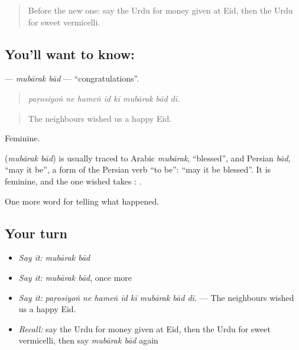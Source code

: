 \label{lesson:UR-C318-mubarak-bad}



\begin{quote}
Before the new one: say the Urdu for money given at Eid, then the Urdu for sweet vermicelli.
\end{quote}

\subsection*{You'll want to know:  }
\textbf{ } — \emph{mubārak bād} — \textquotedblleft{}congratulations\textquotedblright{}.

\begin{quote}
       
\end{quote}

\begin{quote}
\emph{paṛosiyoṅ ne hameṅ īd kī mubārak bād dī.}
\end{quote}

\begin{quote}
The neighbours wished us a happy Eid.
\end{quote}

Feminine.

\begin{cousinweb}
\textbf{ } (\emph{mubārak bād}) is usually traced to Arabic \emph{mubārak}, \textquotedblleft{}blessed\textquotedblright{}, and Persian \emph{bād}, \textquotedblleft{}may it be\textquotedblright{}, a form of the Persian verb \textquotedblleft{}to be\textquotedblright{}: \textquotedblleft{}may it be blessed\textquotedblright{}. It is feminine, and the one wished takes \textbf{}: \textbf{   }.
\end{cousinweb}

\begin{grammarlens}[title={What you've built}]
One more word for telling what happened.
\end{grammarlens}

\subsection*{Your turn}
\begin{itemize}
\raggedright
  \item \emph{Say it:} \emph{mubārak bād}
  \item \emph{Say it:} \emph{mubārak bād}, once more
  \item \emph{Say it:} \emph{paṛosiyoṅ ne hameṅ īd kī mubārak bād dī.} — The neighbours wished us a happy Eid.
  \item \emph{Recall:} say the Urdu for money given at Eid, then the Urdu for sweet vermicelli, then say \emph{mubārak bād} again
\end{itemize}

